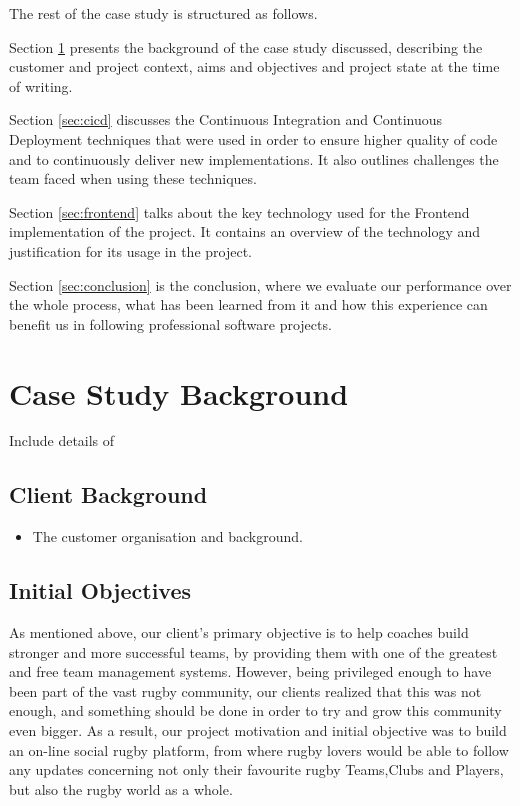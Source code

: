 \documentclass{l3proj}
\begin{document}
The rest of the case study is structured as follows.

Section \ref{sec:background} presents the background of the case study
 discussed, describing the customer and project context, aims and
 objectives and project state at the time of writing.

Section \ref{sec:cicd} discusses the Continuous Integration and Continuous
 Deployment techniques that were used in order to ensure higher quality
 of code and to continuously deliver new implementations. It also outlines
 challenges the team faced when using these techniques.

Section \ref{sec:frontend} talks about the key technology used for the
 Frontend implementation of the project. It contains an overview of the
 technology and justification for its usage in the project.

Section \ref{sec:conclusion} is the conclusion, where we evaluate our
 performance over the whole process, what has been learned from it and
 how this experience can benefit us in following professional software projects.


\section{Case Study Background}
\label{sec:background}
Include details of

\subsection{Client Background}
\begin{itemize}
\item The customer organisation and background.
\end{itemize}

\subsection{Initial Objectives}
As mentioned above, our client's primary objective is to help coaches build
stronger and more successful teams, by providing them with one of the greatest
and free team management systems. However, being privileged enough to have been
part of the vast rugby community, our clients realized that this was not enough,
and something should be done in order to try and grow this community even bigger.
As a result, our project motivation and initial objective was to build an on-line
social rugby platform, from where rugby lovers would be able to follow any
updates concerning not only their favourite rugby Teams,Clubs and Players, but also
the rugby world as a whole.
\end{document}
